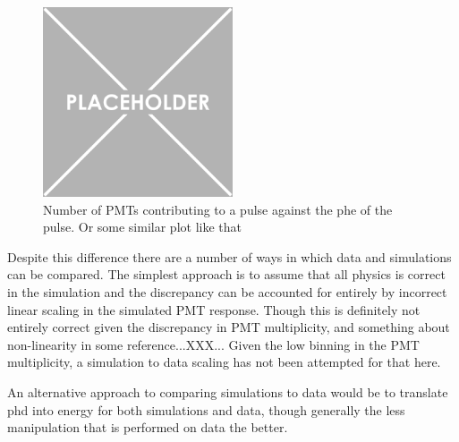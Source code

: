 \begin{figure}
    \centering
    \includegraphics[width=0.5\textwidth]{Figures/Placeholder.png}
    \caption{Number of PMTs contributing to a pulse against the phe of the pulse. Or some similar plot like that}
    \label{fig:OD_coincidence_difference}
\end{figure}



\par
Despite this difference there are a number of ways in which data and simulations can be compared.
The simplest approach is to assume that all physics is correct in the simulation and the discrepancy can be accounted for entirely by incorrect linear scaling in the simulated PMT response.
Though this is definitely not entirely correct given the discrepancy in PMT multiplicity, and something about non-linearity in some reference...XXX...
Given the low binning in the PMT multiplicity, a simulation to data scaling has not been attempted for that here.
\par
An alternative approach to comparing simulations to data would be to translate phd into energy for both simulations and data, though generally the less manipulation that is performed on data the better.

